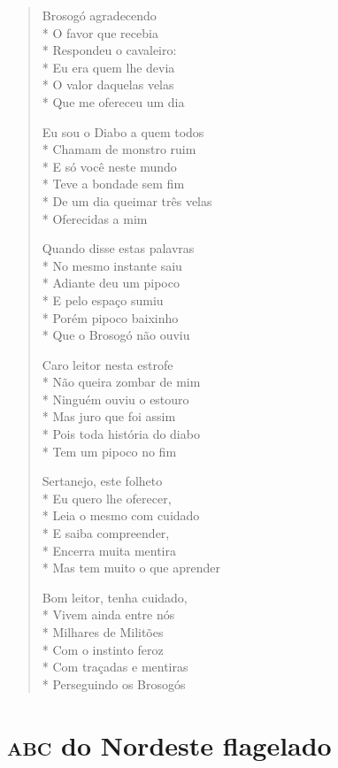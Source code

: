 \begin{verse}
Brosogó agradecendo\\*
O favor que recebia\\*
Respondeu o cavaleiro:\\*
Eu era quem lhe devia\\*
O valor daquelas velas\\*
Que me ofereceu um dia

Eu sou o Diabo a quem todos\\*
Chamam de monstro ruim\\*
E só você neste mundo\\*
Teve a bondade sem fim\\*
De um dia queimar três velas\\*
Oferecidas a mim

Quando disse estas palavras\\*
No mesmo instante saiu\\*
Adiante deu um pipoco\\*
E pelo espaço sumiu\\*
Porém pipoco baixinho\\*
Que o Brosogó não ouviu

Caro leitor nesta estrofe\\*
Não queira zombar de mim\\*
Ninguém ouviu o estouro\\*
Mas juro que foi assim\\*
Pois toda história do diabo\\*
Tem um pipoco no fim

Sertanejo, este folheto\\*
Eu quero lhe oferecer,\\*
Leia o mesmo com cuidado\\*
E saiba compreender,\\*
Encerra muita mentira\\*
Mas tem muito o que aprender

Bom leitor, tenha cuidado,\\*
Vivem ainda entre nós\\*
Milhares de Militões\\*
Com o instinto feroz\\*
Com traçadas e mentiras\\*
Perseguindo os Brosogós

\end{verse}

\chapter{\textsc{abc} do Nordeste flagelado}


